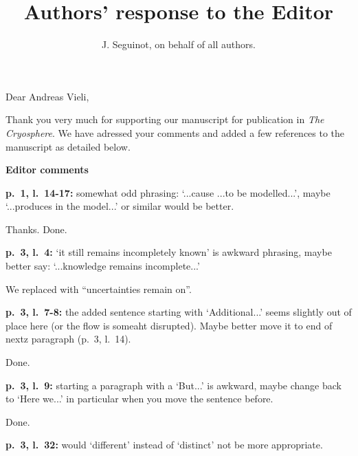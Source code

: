 

\title{Authors' response to the Editor}
\author{J. Seguinot, on behalf of all authors.}


\thispagestyle{empty}
\maketitle
\bigskip


\newcommand{\sechead}[1]{\bigskip\noindent\textbf{#1}}
\newcommand{\referee}[1]{\bigskip\noindent\textcolor{journalname}{#1}}

    Dear Andreas Vieli,

    Thank you very much for supporting our manuscript for publication in
    \emph{The Cryosphere}. We have adressed your comments and added a few
    references to the manuscript as detailed below.



\sechead{Editor comments}

    \referee{\textbf{p.~1, l.~14-17:}
        somewhat odd phrasing: `...cause ...to be modelled...', maybe
        `...produces in the model...' or similar would be better.}

    Thanks. Done.

    \referee{\textbf{p.~3, l.~4:}
        `it still remains incompletely known' is awkward phrasing, maybe better
        say: `...knowledge remains incomplete...'}

    We replaced with ``uncertainties remain on''.

    \referee{\textbf{p.~3, l.~7-8:}
        the added sentence starting with `Additional...' seems slightly out of
        place here (or the flow is someaht disrupted). Maybe better move it to
        end of nextz paragraph (p.~3, l.~14).}

    Done.

    \referee{\textbf{p.~3, l.~9:}
        starting a paragraph with a `But...' is awkward, maybe change back to
        `Here we...' in particular when you move the sentence before.}

    Done.

    \referee{\textbf{p.~3, l.~32:}
        would `different' instead of `distinct' not be more appropriate.}

